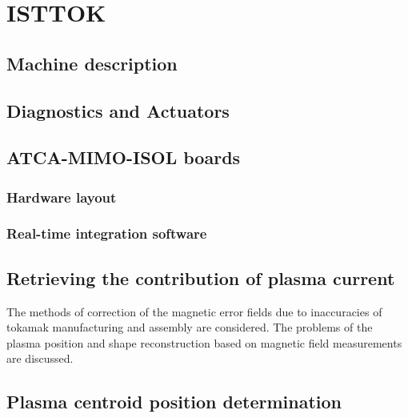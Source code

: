 \chapter{ISTTOK }

\section{Machine description}
\section{Diagnostics and Actuators}
\section{ATCA-MIMO-ISOL boards}
\subsection{Hardware layout}
\subsection{Real-time  integration software}
\section{Retrieving the contribution of plasma current }

The methods of correction of the magnetic error fields due to inaccuracies
of tokamak manufacturing and assembly are considered. The problems of the
plasma position and shape reconstruction based on magnetic field measurements are discussed.

\section{Plasma centroid position determination}
